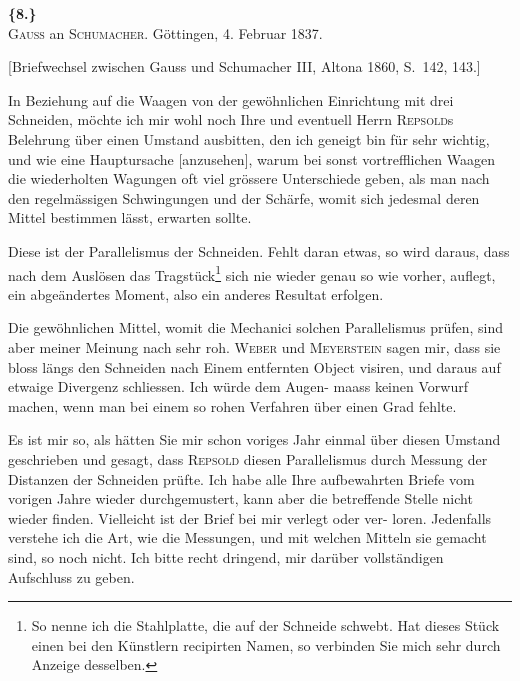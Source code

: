\documentclass[12pt,a4paper]{article}
\theoremstyle{plain}
\theoremstyle{definition}
\theoremstyle{remark}
\begin{document}
\vspace{0.5cm}

\noindent\textbf{\{8.\}}\\
\textsc{Gauss} an \textsc{Schumacher}. G\"ottingen, 4. Februar 1837.

\vspace{0.2cm}
{\small[Briefwechsel zwischen Gauss und Schumacher III, Altona 1860, S.~142, 143.]}

\vspace{0.3cm}

In Beziehung auf die Waagen von der gew\"ohnlichen Einrichtung mit drei
Schneiden, m\"ochte ich mir wohl noch Ihre und eventuell Herrn \textsc{Repsold}s
Belehrung \"uber einen Umstand ausbitten, den ich geneigt bin f\"ur sehr wichtig,
und wie eine Hauptursache [anzusehen], warum bei sonst vortrefflichen Waagen
die wiederholten Wagungen oft viel gr\"ossere Unterschiede geben, als man
nach den regelm\"assigen Schwingungen und der Sch\"arfe, womit sich jedesmal
deren Mittel bestimmen l\"asst, erwarten sollte.

Diese ist der Parallelismus der Schneiden. Fehlt daran etwas, so
wird daraus, dass nach dem Ausl\"osen das Tragst\"uck\footnote{So nenne ich die Stahlplatte, die auf der Schneide schwebt. Hat
dieses St\"uck einen bei den K\"unstlern recipirten Namen, so verbinden Sie
mich sehr durch Anzeige desselben.} sich nie wieder genau
so wie vorher, auflegt, ein abge\"andertes Moment, also ein anderes Resultat
erfolgen.

Die gew\"ohnlichen Mittel, womit die Mechanici solchen Parallelismus
pr\"ufen, sind aber meiner Meinung nach sehr roh. \textsc{Weber} und \textsc{Meyerstein}
sagen mir, dass sie bloss l\"angs den Schneiden nach Einem entfernten Object
visiren, und daraus auf etwaige Divergenz schliessen. Ich w\"urde dem Augen-
maass keinen Vorwurf machen, wenn man bei einem so rohen Verfahren \"uber
einen Grad fehlte.

Es ist mir so, als h\"atten Sie mir schon voriges Jahr einmal \"uber diesen
Umstand geschrieben und gesagt, dass \textsc{Repsold} diesen Parallelismus durch
Messung der Distanzen der Schneiden pr\"ufte. Ich habe alle Ihre aufbewahrten
Briefe vom vorigen Jahre wieder durchgemustert, kann aber die betreffende
Stelle nicht wieder finden. Vielleicht ist der Brief bei mir verlegt oder ver-
loren. Jedenfalls verstehe ich die Art, wie die Messungen, und mit welchen
Mitteln sie gemacht sind, so noch nicht. Ich bitte recht dringend, mir
dar\"uber vollst\"andigen Aufschluss zu geben.
\end{document}
